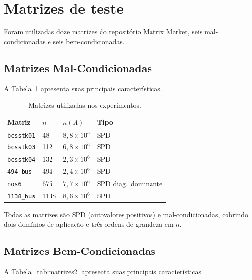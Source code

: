 \documentclass[12pt, a4paper]{article}
\begin{document}
\section{Matrizes de teste}

Foram utilizadas doze matrizes do repositório Matrix Market, seis mal-condicionadas e seis bem-condicionadas.

\subsection{Matrizes Mal-Condicionadas}
A Tabela~\ref{tab:matrizes} apresenta suas principais características.
 
\begin{table}[H]
  \centering
  \caption{Matrizes utilizadas nos experimentos.}
  \label{tab:matrizes}
  \renewcommand{\arraystretch}{1.3}
  \begin{tabular}{llll}
    \toprule
    \textbf{Matriz} & \textbf{$n$} & \textbf{$\kappa(A)$} & \textbf{Tipo} \\
    \midrule
    \texttt{bcsstk01} & 48   & $8{,}8 \times 10^5$ & SPD \\
    \texttt{bcsstk03} & 112  & $6{,}8 \times 10^6$ & SPD \\
    \texttt{bcsstk04} & 132  & $2{,}3 \times 10^6$ & SPD \\
    \texttt{494\_bus} & 494  & $2{,}4 \times 10^6$ & SPD \\
    \texttt{nos6}     & 675  & $7{,}7 \times 10^6$ & SPD diag.\ dominante \\
    \texttt{1138\_bus}& 1138 & $8{,}6 \times 10^6$ & SPD \\
    \bottomrule
  \end{tabular}
\end{table}
 
Todas as matrizes são SPD (autovalores positivos) e mal-condicionadas, cobrindo dois
domínios de aplicação e três ordens de grandeza em $n$.

\subsection{Matrizes Bem-Condicionadas}

A Tabela~\ref{tab:matrizes2} apresenta suas principais características.
 
\end{document}

